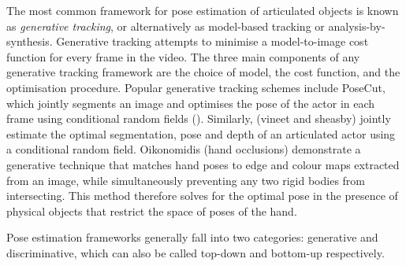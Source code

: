 The most common framework for pose estimation of articulated objects is known as \textit{generative tracking}, or alternatively as model-based tracking or analysis-by-synthesis. Generative tracking attempts to minimise a model-to-image cost function for every frame in the video. The three main components of any generative tracking framework are the choice of model, the cost function, and the optimisation procedure. Popular generative tracking schemes include PoseCut, which jointly segments an image and optimises the pose of the actor in each frame using conditional random fields (). Similarly, (vineet and sheasby) jointly estimate the optimal segmentation, pose and depth of an articulated actor using a conditional random field. Oikonomidis (hand occlusions) demonstrate a generative technique that matches hand poses to edge and colour maps extracted from an image, while simultaneously preventing any two rigid bodies from intersecting. This method therefore solves for the optimal pose in the presence of physical objects that restrict the space of poses of the hand. 

Pose estimation frameworks generally fall into two categories: generative and discriminative, which can also be called top-down and bottom-up respectively. 









































